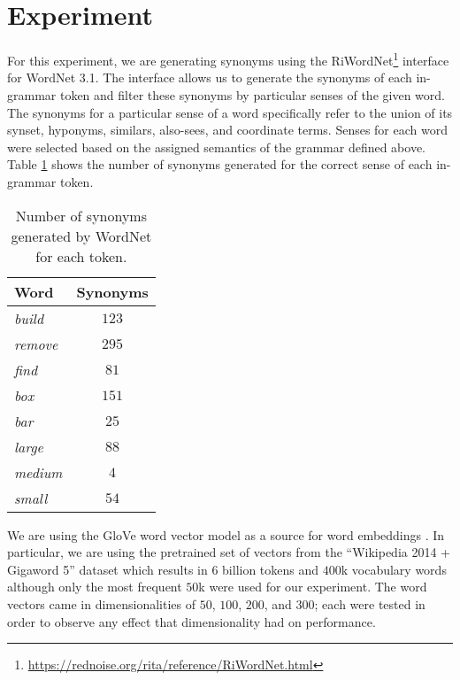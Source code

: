 \documentclass[a4paper]{article}
\begin{document}
\section{Experiment}

For this experiment, we are generating synonyms using the RiWordNet\footnote{
\url{https://rednoise.org/rita/reference/RiWordNet.html}} interface for WordNet 3.1.
The interface allows us to generate the synonyms of each in-grammar token and
filter these synonyms by particular senses of the given word.
The synonyms for a particular
sense of a word specifically refer to the union of its synset, hyponyms,
similars, also-sees, and coordinate terms.
Senses for each word were selected based on the assigned semantics of the
grammar defined above. Table \ref{table-synonyms} shows the number of synonyms
generated for the correct sense of each in-grammar token.

\begin{table}[h]
 \caption{Number of synonyms generated by WordNet for each token.}
 \label{table-synonyms}
 \begin{center}
  \begin{tabular}{l|c}
    \hline \hline
    Word & Synonyms \\
    \hline
    \textit{build} &    $123$ \\
    \textit{remove} &   $295$ \\
    \textit{find} &     $81$ \\
    \textit{box} &      $151$ \\
    \textit{bar} &      $25$ \\
    \textit{large} &    $88$ \\
    \textit{medium} &   $4$ \\
    \textit{small} &    $54$ \\
    \hline
  \end{tabular}
 \end{center}
\end{table}

We are using the GloVe word vector model as a source for word embeddings
\cite{pennington2014glove}. In particular, we are using the pretrained
set of vectors from the ``Wikipedia 2014 + Gigaword 5'' dataset which
results in $6$ billion tokens and $400$k vocabulary words although only
the most frequent $50$k were used for our experiment.
The word vectors came in dimensionalities of $50$, $100$, $200$, and $300$;
each were tested in order to observe any effect that dimensionality had
on performance.
\end{document}
